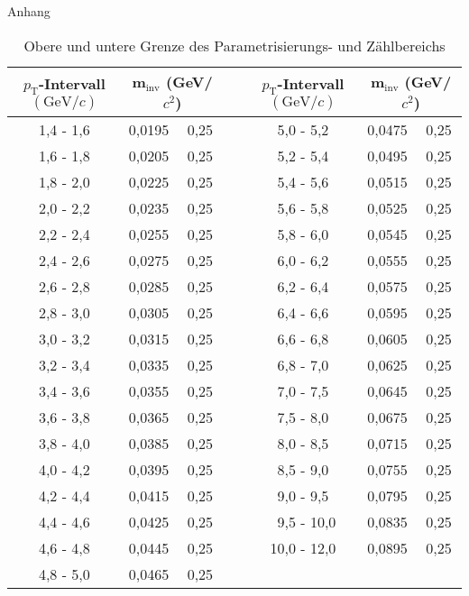 Anhang

\begin{table}[]
	\centering	
	
	\begin{tabular}{ | c || l | l || p{} || c || l | l | }
		\hline
		$p_\text{T}$-Intervall $\left(\text{GeV}/c\right)$ & \multicolumn{2}{|c|}{m$_{\text{inv}}$ (GeV/$c^2$)}  & \  & $p_\text{T}$-Intervall $\left(\text{GeV}/c\right)$ & \multicolumn{2}{|c|}{m$_{\text{inv}}$ (GeV/$c^2$)} \\ \hline

		1,4 - 1,6 &0,0195 & 0,25 & \ & 5,0 - 5,2 & 0,0475 & 0,25 \\ \hline
		1,6 - 1,8 & 0,0205 & 0,25 & \ & 5,2 - 5,4 & 0,0495 & 0,25 \\ \hline
		1,8 - 2,0 & 0,0225 & 0,25 & \ & 5,4 - 5,6 & 0,0515 & 0,25 \\ \hline
		2,0 - 2,2 & 0,0235 & 0,25 & \ & 5,6 - 5,8 & 0,0525 & 0,25 \\ \hline
		2,2 - 2,4 & 0,0255 & 0,25 & \ & 5,8 - 6,0 & 0,0545 & 0,25 \\ \hline
		2,4 - 2,6 & 0,0275 & 0,25 & \ & 6,0 - 6,2 & 0,0555 & 0,25 \\ \hline
		2,6 - 2,8 & 0,0285 & 0,25 & \ & 6,2 - 6,4 & 0,0575 & 0,25 \\ \hline
		2,8 - 3,0 & 0,0305 & 0,25 & \ & 6,4 - 6,6 & 0,0595 & 0,25 \\ \hline
		3,0 - 3,2 & 0,0315 & 0,25 & \ & 6,6 - 6,8 & 0,0605 & 0,25 \\ \hline
		3,2 - 3,4 & 0,0335 & 0,25 & \ & 6,8 - 7,0 & 0,0625 & 0,25 \\ \hline
		3,4 - 3,6 & 0,0355 & 0,25 & \ & 7,0 - 7,5 & 0,0645 & 0,25 \\ \hline
		3,6 - 3,8 & 0,0365 & 0,25 & \ & 7,5 - 8,0 & 0,0675 & 0,25 \\ \hline
		3,8 - 4,0 & 0,0385 & 0,25 & \ & 8,0 - 8,5 & 0,0715 & 0,25 \\ \hline
		4,0 - 4,2 & 0,0395 & 0,25 & \ & 8,5 - 9,0 & 0,0755 & 0,25 \\ \hline
		4,2 - 4,4 & 0,0415 & 0,25 & \ & 9,0 - 9,5 & 0,0795 & 0,25 \\ \hline
		4,4 - 4,6 & 0,0425 & 0,25 & \ & \ 9,5 - 10,0 & 0,0835 & 0,25 \\ \hline
		4,6 - 4,8 & 0,0445 & 0,25 & \ & 10,0 - 12,0 & 0,0895 & 0,25 \\ \hline
		4,8 - 5,0 & 0,0465 & 0,25 & \ & \  & \  & \  \\ \hline
	\end{tabular}
	
	\caption{Obere und untere Grenze des Parametrisierungs- und Zählbereichs}
	\label{tab:ParamAndIntRange}
	
\end{table}



